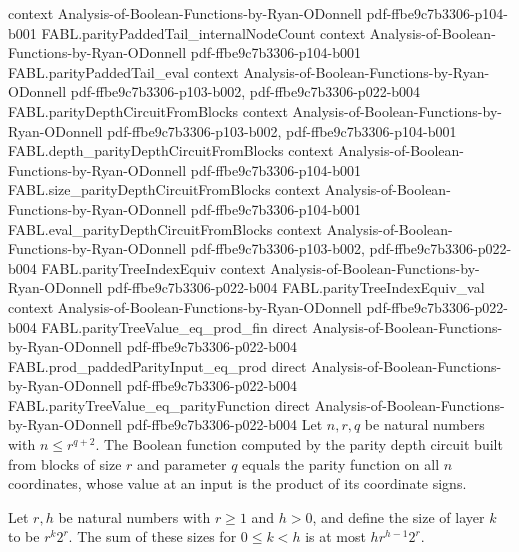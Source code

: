 \begin{theorem}
  {context}
  {Analysis-of-Boolean-Functions-by-Ryan-ODonnell}
  {pdf-ffbe9c7b3306-p104-b001}
\proofstep
  {FABL.parityPaddedTail_internalNodeCount}
  {context}
  {Analysis-of-Boolean-Functions-by-Ryan-ODonnell}
  {pdf-ffbe9c7b3306-p104-b001}
\proofstep
  {FABL.parityPaddedTail_eval}
  {context}
  {Analysis-of-Boolean-Functions-by-Ryan-ODonnell}
  {pdf-ffbe9c7b3306-p103-b002,
    pdf-ffbe9c7b3306-p022-b004}
\proofstep
  {FABL.parityDepthCircuitFromBlocks}
  {context}
  {Analysis-of-Boolean-Functions-by-Ryan-ODonnell}
  {pdf-ffbe9c7b3306-p103-b002,
    pdf-ffbe9c7b3306-p104-b001}
\proofstep
  {FABL.depth_parityDepthCircuitFromBlocks}
  {context}
  {Analysis-of-Boolean-Functions-by-Ryan-ODonnell}
  {pdf-ffbe9c7b3306-p104-b001}
\proofstep
  {FABL.size_parityDepthCircuitFromBlocks}
  {context}
  {Analysis-of-Boolean-Functions-by-Ryan-ODonnell}
  {pdf-ffbe9c7b3306-p104-b001}
\proofstep
  {FABL.eval_parityDepthCircuitFromBlocks}
  {context}
  {Analysis-of-Boolean-Functions-by-Ryan-ODonnell}
  {pdf-ffbe9c7b3306-p103-b002,
    pdf-ffbe9c7b3306-p022-b004}
\proofstep
  {FABL.parityTreeIndexEquiv}
  {context}
  {Analysis-of-Boolean-Functions-by-Ryan-ODonnell}
  {pdf-ffbe9c7b3306-p022-b004}
\proofstep
  {FABL.parityTreeIndexEquiv_val}
  {context}
  {Analysis-of-Boolean-Functions-by-Ryan-ODonnell}
  {pdf-ffbe9c7b3306-p022-b004}
\proofstep
  {FABL.parityTreeValue_eq_prod_fin}
  {direct}
  {Analysis-of-Boolean-Functions-by-Ryan-ODonnell}
  {pdf-ffbe9c7b3306-p022-b004}
\proofstep
  {FABL.prod_paddedParityInput_eq_prod}
  {direct}
  {Analysis-of-Boolean-Functions-by-Ryan-ODonnell}
  {pdf-ffbe9c7b3306-p022-b004}
\proofstep
  {FABL.parityTreeValue_eq_parityFunction}
  {direct}
  {Analysis-of-Boolean-Functions-by-Ryan-ODonnell}
  {pdf-ffbe9c7b3306-p022-b004}
Let $n,r,q$ be natural numbers with $n\le r^{q+2}$. The Boolean function computed by the
parity depth circuit built from blocks of size $r$ and parameter $q$ equals the parity
function on all $n$ coordinates, whose value at an input is the product of its
coordinate signs.
\end{theorem}

\begin{theorem}
\label{FABL.sum_parityLayerSize_le}
\leanok
{}
Let $r,h$ be natural numbers with $r\ge1$ and $h>0$, and define the size of layer $k$ to
be $r^k2^r$. The sum of these sizes for $0\le k<h$ is at most $h r^{h-1}2^r$.
\end{theorem}


